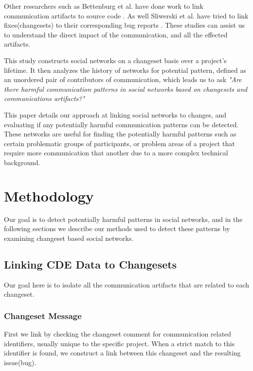 \documentclass[conference]{IEEEtran}
\begin{document}
Other researchers such as Bettenburg et al. have done work to link communication artifacts to source code \cite{Bettenburg:2008:ESI:1370750.1370757}.  As well Sliwerski et al. have tried to link fixes(changesets) to their corresponding bug reports \cite{Sliwerski:2005:CIF:1083142.1083147}.  These studies can assist us to understand the direct impact of the communication, and all the effected artifacts.  

This study constructs social networks on a changeset basis over a project's lifetime.  It then analyzes the history of networks for potential pattern, defined as an unordered pair of contributors of communication, which leads us to ask \textit{"Are there harmful communication patterns in social networks based on changesets and communications artifacts?"} 

This paper details our approach at linking social networks to changes, and evaluating if any potentially harmful communication patterns can be detected.  These networks are useful for finding the potentially harmful patterns such as certain problematic groups of participants, or problem areas of a project that require more communication that another due to a more complex technical background. 

\section{Methodology}
Our goal is to detect potentially harmful patterns in social networks, and in the following sections we describe our methods used to detect these patterns by examining changeset based social networks.

\subsection{Linking CDE Data to Changesets}
Our goal here is to isolate all the communication artifacts that are related to each changeset.  

\subsubsection{Changeset Message}
First we link by checking the changeset comment for communication related identifiers, usually unique to the specific project.  When a strict match to this identifier is found, we construct a link between this changeset and the resulting issue(bug).  
\end{document}
